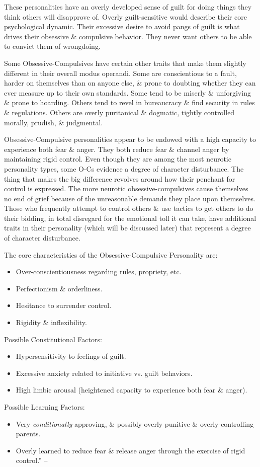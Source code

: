 \documentclass{article}
\numberwithin{equation}{section}
\begin{document}
These personalities have an overly developed sense of guilt for doing things they think others will disapprove of. Overly guilt-sensitive would describe their core psychological dynamic. Their excessive desire to avoid pangs of guilt is what drives their obsessive \& compulsive behavior. They never want others to be able to convict them of wrongdoing.

Some Obsessive-Compulsives have certain other traits that make them slightly different in their overall modus operandi. Some are conscientious to a fault, harder on themselves than on anyone else, \& prone to doubting whether they can ever measure up to their own standards. Some tend to be miserly \& unforgiving \& prone to hoarding. Others tend to revel in bureaucracy \& find security in rules \& regulations. Others are overly puritanical \& dogmatic, tightly controlled morally, prudish, \& judgmental.

Obsessive-Compulsive personalities appear to be endowed with a high capacity to experience both fear \& anger. They both reduce fear \& channel anger by maintaining rigid control. Even though they are among the most neurotic personality types, some O-Cs evidence a degree of character disturbance. The thing that makes the big difference revolves around how their penchant for control is expressed. The more neurotic obsessive-compulsives cause themselves no end of grief because of the unreasonable demands they place upon themselves. Those who frequently attempt to control others \& use tactics to get others to do their bidding, in total disregard for the emotional toll it can take, have additional traits in their personality (which will be discussed later) that represent a degree of character disturbance.

The core characteristics of the Obsessive-Compulsive Personality are:
\begin{itemize}
	\item Over-conscientiousness regarding rules, propriety, etc.
	\item Perfectionism \& orderliness.
	\item Hesitance to surrender control.
	\item Rigidity \& inflexibility.
\end{itemize}
Possible Constitutional Factors:
\begin{itemize}
	\item Hypersensitivity to feelings of guilt.
	\item Excessive anxiety related to initiative vs. guilt behaviors.
	\item High limbic arousal (heightened capacity to experience both fear \& anger).
\end{itemize}
Possible Learning Factors:
\begin{itemize}
	\item Very \textit{conditionally}-approving, \& possibly overly punitive \& overly-controlling parents.
	\item Overly learned to reduce fear \& release anger through the exercise of rigid control.'' -- \cite[pp. 64--66]{Simon2011}
\end{itemize}
\end{document}
